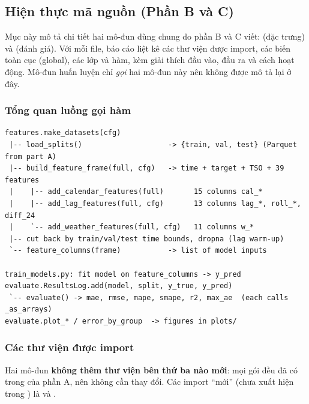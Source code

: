 \subsection{Hiện thực mã nguồn (Phần B và C)}\label{sec:impl}

Mục này mô tả chi tiết hai mô-đun dùng chung do phần B và C viết:  (đặc trưng) và
 (đánh giá). Với mỗi file, báo cáo liệt kê các thư viện được import, các biến toàn cục
(global), các lớp và hàm, kèm giải thích đầu vào, đầu ra và cách hoạt động. Mô-đun huấn luyện
 chỉ \emph{gọi} hai mô-đun này nên không được mô tả lại ở đây.

\subsubsection{Tổng quan luồng gọi hàm}\label{sec:impl-flow}

\begin{lstlisting}[language={},numbers=none,caption={Luồng gọi hàm từ dữ liệu đã chia đến bảng kết quả.},label={lst:callgraph}]
features.make_datasets(cfg)
 |-- load_splits()                    -> {train, val, test} (Parquet from part A)
 |-- build_feature_frame(full, cfg)   -> time + target + TSO + 39 features
 |    |-- add_calendar_features(full)       15 columns cal_*
 |    |-- add_lag_features(full, cfg)       13 columns lag_*, roll_*, diff_24
 |    `-- add_weather_features(full, cfg)   11 columns w_*
 |-- cut back by train/val/test time bounds, dropna (lag warm-up)
 `-- feature_columns(frame)           -> list of model inputs

train_models.py: fit model on feature_columns -> y_pred
evaluate.ResultsLog.add(model, split, y_true, y_pred)
 `-- evaluate() -> mae, rmse, mape, smape, r2, max_ae  (each calls _as_arrays)
evaluate.plot_* / error_by_group  -> figures in plots/
\end{lstlisting}

\subsubsection{Các thư viện được import}\label{sec:impl-imports}

Hai mô-đun \textbf{không thêm thư viện bên thứ ba nào mới}: mọi gói đều đã có trong 
của phần A, nên  không cần thay đổi. Các import ``mới'' (chưa xuất hiện trong
) là  và .

